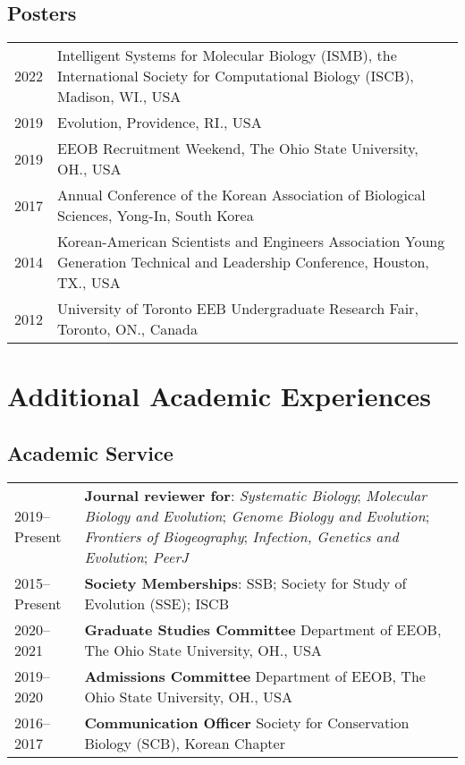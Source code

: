 \documentclass[11pt]{article}
\begin{document}
\subsection*{Posters}
\begin{longtable}{p{}  p{}}
2022 & {\color{cyan}{\textbf{[Best Poster Award Winner]}}} Intelligent Systems for Molecular Biology (ISMB), the International Society for Computational Biology (ISCB), Madison, WI., USA\\
2019 & Evolution, Providence, RI., USA \\
2019 &  EEOB Recruitment Weekend,  The Ohio State University, OH., USA \\
2017 & Annual Conference of the Korean Association of Biological Sciences, Yong-In, South Korea \\ 
2014 & Korean-American Scientists and Engineers Association Young Generation Technical and Leadership Conference, Houston, TX., USA \\ 
2012 & University of Toronto EEB Undergraduate Research Fair, Toronto, ON., Canada\\
\end{longtable}

\hspace{0pt}





\section*{Additional Academic Experiences}

\subsection*{Academic Service}
\begin{longtable}{p{}  p{}}
2019--Present &	\textbf{Journal reviewer for}: \textit{Systematic Biology}; \textit{Molecular Biology and Evolution}; \textit{Genome Biology and Evolution}; \textit{Frontiers of Biogeography}; \textit{Infection, Genetics and Evolution}; \textit{PeerJ}\\
2015--Present &  \textbf{Society Memberships}: SSB; Society for Study of Evolution (SSE); ISCB\\

2020--2021 &  \textbf{Graduate Studies Committee} Department of EEOB, The Ohio State University, OH., USA\\
2019--2020 &	\textbf{Admissions Committee} Department of EEOB, The Ohio State University, OH., USA\\
2016--2017 &	\textbf{Communication Officer} Society for Conservation Biology (SCB), Korean Chapter\vspace{5pt}\\
\end{longtable}
\end{document}
